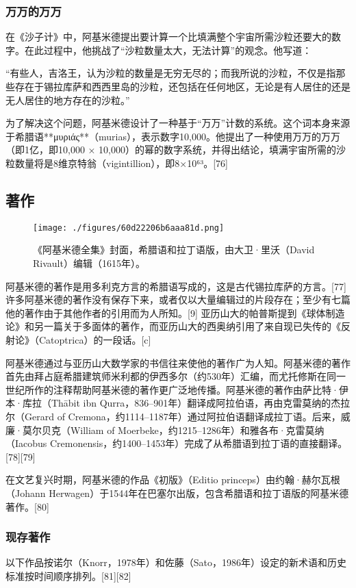 \subsubsection{万万的万万}
在《沙子计》中，阿基米德提出要计算一个比填满整个宇宙所需沙粒还要大的数字。在此过程中，他挑战了“沙粒数量太大，无法计算”的观念。他写道：

“有些人，吉洛王，认为沙粒的数量是无穷无尽的；而我所说的沙粒，不仅是指那些存在于锡拉库萨和西西里岛的沙粒，还包括在任何地区，无论是有人居住的还是无人居住的地方存在的沙粒。”

为了解决这个问题，阿基米德设计了一种基于“万万”计数的系统。这个词本身来源于希腊语**μυριάς**（murias），表示数字10,000。他提出了一种使用万万的万万（即1亿，即10,000 × 10,000）的幂的数字系统，并得出结论，填满宇宙所需的沙粒数量将是8维京特翁（vigintillion），即8×10⁶³。[76]
\subsection{著作}
\begin{figure}[ht]
\centering
\texttt{[image: ./figures/60d22206b6aaa81d.png]}
\caption{《阿基米德全集》封面，希腊语和拉丁语版，由大卫·里沃（David Rivault）编辑（1615年）。} \label{fig_Archim_7}
\end{figure}
阿基米德的著作是用多利克方言的希腊语写成的，这是古代锡拉库萨的方言。[77] 许多阿基米德的著作没有保存下来，或者仅以大量编辑过的片段存在；至少有七篇他的著作由于其他作者的引用而为人所知。[9] 亚历山大的帕普斯提到《球体制造论》和另一篇关于多面体的著作，而亚历山大的西奥纳引用了来自现已失传的《反射论》（Catoptrica）的一段话。[c]

阿基米德通过与亚历山大数学家的书信往来使他的著作广为人知。阿基米德的著作首先由拜占庭希腊建筑师米利都的伊西多尔（约530年）汇编，而尤托修斯在同一世纪所作的注释帮助阿基米德的著作更广泛地传播。阿基米德的著作由萨比特·伊本·库拉（Thābit ibn Qurra，836–901年）翻译成阿拉伯语，再由克雷莫纳的杰拉尔（Gerard of Cremona，约1114–1187年）通过阿拉伯语翻译成拉丁语。后来，威廉·莫尔贝克（William of Moerbeke，约1215–1286年）和雅各布·克雷莫纳（Iacobus Cremonensis，约1400–1453年）完成了从希腊语到拉丁语的直接翻译。[78][79]

在文艺复兴时期，阿基米德的作品《初版》（Editio princeps）由约翰·赫尔瓦根（Johann Herwagen）于1544年在巴塞尔出版，包含希腊语和拉丁语版的阿基米德著作。[80]
\subsubsection{现存著作} 
以下作品按诺尔（Knorr，1978年）和佐藤（Sato，1986年）设定的新术语和历史标准按时间顺序排列。[81][82]

